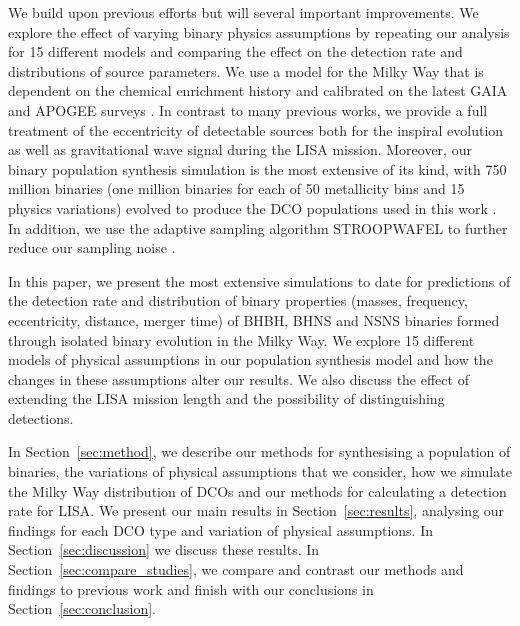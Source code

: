 We build upon previous efforts but will several important improvements. We explore the effect of varying binary physics assumptions by repeating our analysis for 15 different models and comparing the effect on the detection rate and distributions of source parameters. We use a model for the Milky Way that is dependent on the chemical enrichment history and calibrated on the latest GAIA and APOGEE surveys \citep{Frankel+2018}. In contrast to many previous works, we provide a full treatment of the eccentricity of detectable sources both for the inspiral evolution as well as gravitational wave signal during the LISA mission. Moreover, our binary population synthesis simulation is the most extensive of its kind, with 750 million binaries (one million binaries for each of 50 metallicity bins and 15 physics variations) evolved to produce the DCO populations used in this work \citep{Broekgaarden+2021}. In addition, we use the adaptive sampling algorithm STROOPWAFEL to further reduce our sampling noise \citep{Broekgaarden+2019}.

In this paper, we present the most extensive simulations to date for predictions of the detection rate and distribution of binary properties (masses, frequency, eccentricity, distance, merger time) of BHBH, BHNS and NSNS binaries formed through isolated binary evolution in the Milky Way. We explore 15 different models of physical assumptions in our population synthesis model and how the changes in these assumptions alter our results. We also discuss the effect of extending the LISA mission length and the possibility of distinguishing detections.

In Section~\ref{sec:method}, we describe our methods for synthesising a population of binaries, the variations of physical assumptions that we consider, how we simulate the Milky Way distribution of DCOs and our methods for calculating a detection rate for LISA. We present our main results in Section~\ref{sec:results}, analysing our findings for each DCO type and variation of physical assumptions. In Section~\ref{sec:discussion} we discuss these results. In Section~\ref{sec:compare_studies}, we compare and contrast our methods and findings to previous work and finish with our conclusions in Section~\ref{sec:conclusion}.